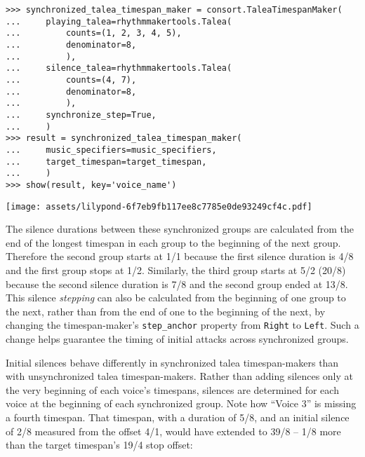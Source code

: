 \begin{abjadbookoutput}
\begin{singlespacing}
\vspace{-0.5\baselineskip}
\begin{lstlisting}
>>> synchronized_talea_timespan_maker = consort.TaleaTimespanMaker(
...     playing_talea=rhythmmakertools.Talea(
...         counts=(1, 2, 3, 4, 5),
...         denominator=8,
...         ),
...     silence_talea=rhythmmakertools.Talea(
...         counts=(4, 7),
...         denominator=8,
...         ),
...     synchronize_step=True,
...     )
>>> result = synchronized_talea_timespan_maker(
...     music_specifiers=music_specifiers,
...     target_timespan=target_timespan,
...     )
>>> show(result, key='voice_name')
\end{lstlisting}
\noindent\texttt{[image: assets/lilypond-6f7eb9fb117ee8c7785e0de93249cf4c.pdf]}
\end{singlespacing}
\end{abjadbookoutput}

\noindent The silence durations between these synchronized groups are
calculated from the end of the longest timespan in each group to the beginning
of the next group. Therefore the second group starts at 1/1 because the first
silence duration is 4/8 and the first group stops at 1/2. Similarly, the third
group starts at 5/2 (20/8) because the second silence duration is 7/8 and the
second group ended at 13/8. This silence \emph{stepping} can also be calculated
from the beginning of one group to the next, rather than from the end of one to
the beginning of the next, by changing the timespan-maker's
\texttt{step\_anchor} property from \texttt{Right} to \texttt{Left}. Such a
change helps guarantee the timing of initial attacks across synchronized
groups.

Initial silences behave differently in synchronized talea timespan-makers than
with unsynchronized talea timespan-makers. Rather than adding silences only at
the very beginning of each voice's timespans, silences are determined for each
voice at the beginning of each synchronized group. Note how \enquote{Voice 3}
is missing a fourth timespan. That timespan, with a duration of 5/8, and an
initial silence of 2/8 measured from the offset 4/1, would have extended to
39/8 -- 1/8 more than the target timespan's 19/4 stop offset:

\begin{comment}
<abjad>
synchronized_talea_timespan_maker = new(
    synchronized_talea_timespan_maker,
    initial_silence_talea=rhythmmakertools.Talea(
        counts=(0, 1, 2),
        denominator=8,
        ),
    )
result = synchronized_talea_timespan_maker(
    music_specifiers=music_specifiers,
    target_timespan=target_timespan,
    )
show(result, key='voice_name')
</abjad>
\end{comment}

